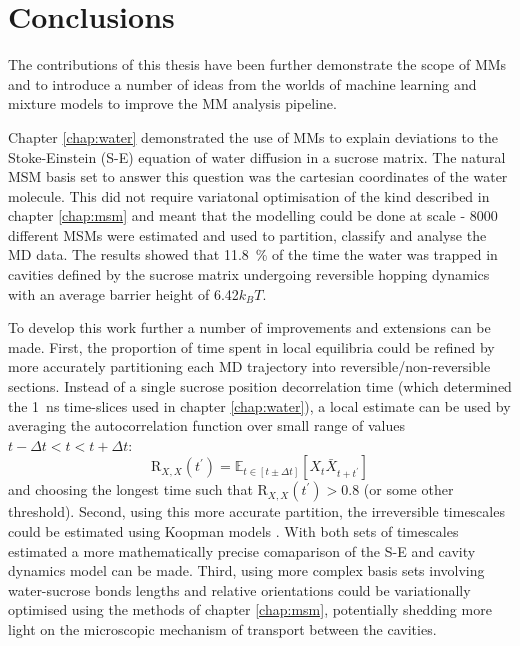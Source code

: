 \let\textcircled=\pgftextcircled
\chapter{Conclusions}
\label{chap:conclusions}


The contributions of this thesis have been further demonstrate the scope of MMs and to introduce a number of ideas from the worlds of machine learning and mixture models to improve the MM analysis pipeline. 

Chapter \ref{chap:water} demonstrated the use of MMs to explain deviations to the Stoke-Einstein (S-E) equation of water diffusion in a sucrose matrix. The natural MSM basis set to answer this question was the cartesian coordinates of the water molecule. This did not require variatonal optimisation of the kind described in chapter \ref{chap:msm} and meant that the modelling could be done at scale - 8000 different MSMs were estimated and used to partition, classify and analyse the MD data. The results showed that \SI{11.8}{\percent} of the time the water was trapped in cavities defined by the sucrose matrix undergoing reversible hopping dynamics with an average barrier height of \num{6.42}$k_{B}T$. 

To develop this work further a number of improvements and extensions can be made. First, the proportion of time spent in local equilibria could be refined by more accurately partitioning each MD trajectory into reversible/non-reversible sections. Instead of a single sucrose position decorrelation time (which determined the \SI{1}{\nano\second} time-slices used in chapter \ref{chap:water}), a local estimate can be used by averaging the autocorrelation function over small range of values $t-\Delta t < t < t+\Delta t$:
\begin{equation}
\mathrm{R}_{X,  X}(t^{\prime})=\mathbb{E}_{t \in [t\pm\Delta t]}\left[X_{t} \bar{X}_{t+t^{\prime}}\right]
\end{equation}
and choosing the longest time such that $\mathrm{R}_{X,  X}(t^{\prime}) > 0.8$ (or some other threshold). Second, using this more accurate partition, the irreversible timescales could be estimated using Koopman models \cite{wuVariationalApproachLearning2019}. With both sets of timescales estimated a more mathematically precise comaparison of the S-E and cavity dynamics model can be made. Third, using more complex basis sets involving water-sucrose bonds lengths and relative orientations could be  variationally  optimised using the methods of chapter \ref{chap:msm}, potentially shedding more light on the microscopic mechanism of transport between the cavities. 

